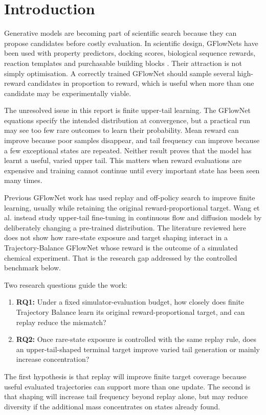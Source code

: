 \documentclass{article}
\begin{document}
\section{Introduction}

Generative models are becoming part of scientific search because they can propose candidates before costly evaluation. In scientific design, GFlowNets have been used with property predictors, docking scores, biological sequence rewards, reaction templates and purchasable building blocks \citep{bengio2021flow,jain2022biological,koziarski2024rgfn,cretu2025synflownet,seo2025rxnflow}. Their attraction is not simply optimisation. A correctly trained GFlowNet should sample several high-reward candidates in proportion to reward, which is useful when more than one candidate may be experimentally viable.

The unresolved issue in this report is finite upper-tail learning. The GFlowNet equations specify the intended distribution at convergence, but a practical run may see too few rare outcomes to learn their probability. Mean reward can improve because poor samples disappear, and tail frequency can improve because a few exceptional states are repeated. Neither result proves that the model has learnt a useful, varied upper tail. This matters when reward evaluations are expensive and training cannot continue until every important state has been seen many times.

Previous GFlowNet work has used replay and off-policy search to improve finite learning, usually while retaining the original reward-proportional target. Wang et al. instead study upper-tail fine-tuning in continuous flow and diffusion models by deliberately changing a pre-trained distribution. The literature reviewed here does not show how rare-state exposure and target shaping interact in a Trajectory-Balance GFlowNet whose reward is the outcome of a simulated chemical experiment. That is the research gap addressed by the controlled benchmark below.

Two research questions guide the work:
\begin{enumerate}
    \item \textbf{RQ1:} Under a fixed simulator-evaluation budget, how closely does finite Trajectory Balance learn its original reward-proportional target, and can replay reduce the mismatch?
    \item \textbf{RQ2:} Once rare-state exposure is controlled with the same replay rule, does an upper-tail-shaped terminal target improve varied tail generation or mainly increase concentration?
\end{enumerate}
The first hypothesis is that replay will improve finite target coverage because useful evaluated trajectories can support more than one update. The second is that shaping will increase tail frequency beyond replay alone, but may reduce diversity if the additional mass concentrates on states already found.
\end{document}
